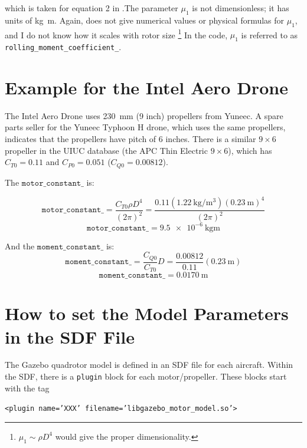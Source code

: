 \documentclass[12pt]{article}
\begin{document}
which is taken for equation 2 in \cite{martin:hal-00422423}.The parameter $\mu_1$ is not dimensionless; it has units of \si{\kilogram \meter}. Again, \cite{martin:hal-00422423} does not give numerical values or physical formulas for $\mu_1$, and I do not know how it scales with rotor size \footnote{$\mu_1 \sim \rho D^4$ would give the proper dimensionality.}
In the code, $\mu_1$ is referred to as \texttt{rolling\_moment\_coefficient\_}.


\section{Example for the Intel Aero Drone}  \label{sec:example}
The Intel Aero Drone uses \SI{230}{\milli\meter} (9 inch) propellers from Yuneec. A spare parts seller for the Yuneec Typhoon H drone, which uses the same propellers, indicates that the propellers have pitch of 6 inches. There is a similar $9 \times 6$ propeller in the UIUC database (the APC Thin Electric $9 \times 6$), which has $C_{T0} = 0.11$ and $C_{P0} = 0.051$ ($C_{Q0} = 0.00812$).

The $\mathtt{motor\_constant\_}$ is:

\begin{equation}
\mathtt{motor\_constant\_} = \frac{C_{T0} \rho D^4}{(2 \pi)^2} = \frac{0.11 (\SI{1.22}{\kilogram\per\meter\cubed}) (\SI{0.23}{\meter})^4}{(2 \pi)^2}
\end{equation}
\begin{equation}
\mathtt{motor\_constant\_} = \SI{9.5e-6}{\kilogram\meter}
\end{equation}

And the $\mathtt{moment\_constant\_}$ is:
\begin{equation}
\mathtt{moment\_constant\_} = \frac{C_{Q0}}{C_{T0}} D = \frac{0.00812}{0.11} (\SI{0.23}{\meter})
\end{equation}
\begin{equation}
\mathtt{moment\_constant\_} = \SI{0.0170}{\meter}
\end{equation}


\section{How to set the Model Parameters in the SDF File} \label{sec:sdf}
The Gazebo quadrotor model is defined in an SDF file for each aircraft. Within the SDF, there is a \texttt{plugin} block for each motor/propeller. These blocks start with the tag

\texttt{<plugin name='XXX' filename='libgazebo\_motor\_model.so'>}
\end{document}
